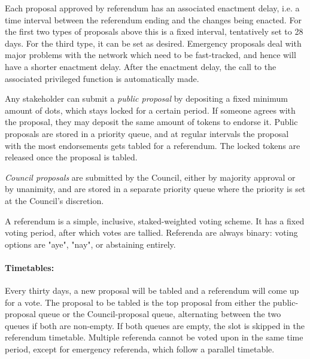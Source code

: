 Each proposal approved by referendum has an associated enactment delay, i.e. a time interval between the referendum ending and the changes being enacted. For the first two types of proposals above this is a fixed interval, tentatively set to 28 days. For the third type, it can be set as desired. Emergency proposals deal with major problems with the network which need to be fast-tracked, and hence will have a shorter enactment delay. After the enactment delay, the call to the associated privileged function is automatically made.

Any stakeholder can submit a \emph{public proposal} by depositing a fixed minimum amount of dots, which stays locked for a certain period. If someone agrees with the proposal, they may deposit the same amount of tokens to endorse it. Public proposals are stored in a priority queue, and at regular intervals the proposal with the most endorsements gets tabled for a referendum. The locked tokens are released once the proposal is tabled.

\emph{Council proposals} are submitted by the Council, either by majority approval or by unanimity, and are stored in a separate priority queue where the priority is set at the Council's discretion. 


A referendum is a simple, inclusive, staked-weighted voting scheme. It has a fixed voting period, after which votes are tallied. Referenda are always binary: voting options are "aye", "nay", or abstaining entirely.

\paragraph{Timetables:} Every thirty days, a new proposal will be tabled and a referendum will come up for a vote. The proposal to be tabled is the top proposal from either the public-proposal queue or the Council-proposal queue, alternating between the two queues if both are non-empty. If both queues are empty, the slot is skipped in the referendum timetable. Multiple referenda cannot be voted upon in the same time period, except for emergency referenda, which follow a parallel timetable.

